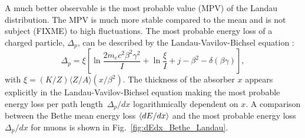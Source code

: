 A much better observable is the most probable value (MPV) of the Landau distribution.
The MPV is much more stable compared to the mean and is not subject (FIXME) to high \dedx fluctuations. 
The most probable energy loss of a charged particle, $\Delta_p$, can be described by the Landau-Vavilov-Bichsel equation \cite{bib:Bichsel:MPV_1988}:
\begin{equation}
\Delta_p = \xi \left[ \ln \frac{2m_e c^2\beta^2\gamma^2}{I}  + \ln\frac{\xi}{I} + j - \beta^2 - \delta(\beta\gamma)  \right],
\label{eq:Landau_Vavilov_Bichsel}
\end{equation}
with $\xi=(K/Z)\langle Z/A \rangle (x/\beta^2)$. 
The thickness of the absorber $x$ appears explicitly in the Landau-Vavilov-Bichsel equation making the most probable energy loss per path \mbox{length $\Delta_p/dx$} logarithmically dependent on $x$.
A comparison between the Bethe mean energy loss $\langle dE/dx \rangle$ and the most probable energy loss $\Delta_p/dx$ for muons is shown in Fig.~\ref{fig:dEdx_Bethe_Landau}.



